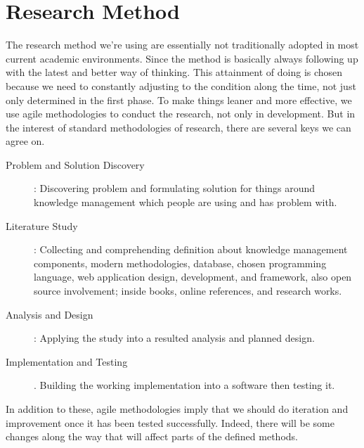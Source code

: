 \section{Research Method}
\label{sec:research-method}

The research method we're using are essentially not traditionally adopted in most current academic environments.
Since the method is basically always following up with the latest and better way of thinking.
This attainment of doing is chosen because we need to constantly adjusting to the condition along the time, not just only determined in the first phase.
To make things leaner and more effective, we use agile methodologies to conduct the research, not only in development.
But in the interest of standard methodologies of research, there are several keys we can agree on.

\begin{description}
\item [Problem and Solution Discovery]:
Discovering problem and formulating solution for things around knowledge management which people are using and has problem with.
\item [Literature Study]:
Collecting and comprehending definition about knowledge management components, modern methodologies, database, chosen programming language, web application design, development, and framework, also open source involvement; inside books, online references, and research works.
\item [Analysis and Design]:
Applying the study into a resulted analysis and planned design.
\item [Implementation and Testing].
Building the working implementation into a software then testing it.
\end{description}

In addition to these, agile methodologies imply that we should do iteration and improvement once it has been tested successfully.
Indeed, there will be some changes along the way that will affect parts of the defined methods.

